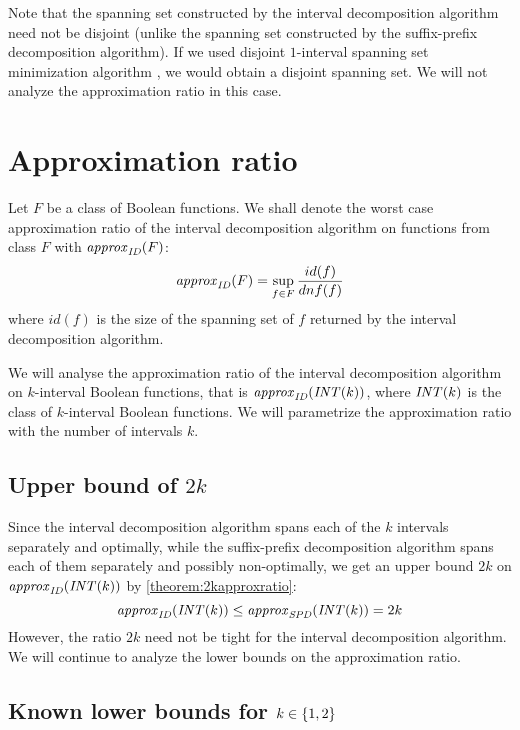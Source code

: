 Note that the spanning set constructed
by the interval decomposition algorithm
need not be disjoint
(unlike the spanning set constructed
by the suffix-prefix decomposition algorithm).
If we used \citeauthor{Schieber2005154}
disjoint $1$-interval spanning set minimization algorithm
\citep{Schieber2005154},
we would obtain a disjoint spanning set.
We will not analyze the approximation ratio in this case.

\section{Approximation ratio}

Let $F$ be a class of Boolean functions.
We shall denote the worst case approximation ratio
of the interval decomposition algorithm
on functions from class $F$ with $\mathit{approx}_{\mathit{ID}} (F)$:
$$
\mathit{approx}_{\mathit{ID}} (F)
= \sup_{f \in F}{\frac{id(f)}{dnf(f)}}
$$
where $id(f)$ is the size of the spanning set of $f$
returned by the interval decomposition algorithm.

We will analyse the approximation ratio
of the interval decomposition algorithm
on $k$-interval Boolean functions,
that is $\mathit{approx}_{\mathit{ID}} (\mathit{INT} (k))$,
where $\mathit{INT} (k)$ is the class
of $k$-interval Boolean functions.
We will parametrize the approximation ratio
with the number of intervals $k$.

\subsection{Upper bound of $2k$}

Since the interval decomposition algorithm
spans each of the $k$ intervals separately and optimally,
while the suffix-prefix decomposition algorithm
spans each of them separately and possibly non-optimally,
we get an upper bound $2k$
on $\mathit{approx}_{\mathit{ID}} (\mathit{INT} (k))$ by \cref{theorem:2kapproxratio}:
$$
\mathit{approx}_{\mathit{ID}} (\mathit{INT} (k)) \leq \mathit{approx}_{\mathit{SPD}} (\mathit{INT} (k)) = 2k
$$
However,
the ratio $2k$ need not be tight
for the interval decomposition algorithm.
We will continue to analyze the lower bounds
on the approximation ratio.

\subsection{Known lower bounds for $k \in \{1, 2\}$}

